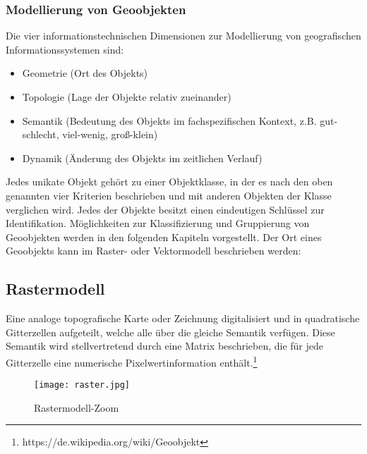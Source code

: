 \documentclass[11pt,ceqn]{book}
\begin{document}
\subsubsection{Modellierung von Geoobjekten}
Die vier informationstechnischen Dimensionen zur Modellierung von geografischen Informationssystemen sind:
\begin{itemize}
\item Geometrie (Ort des Objekts)
\item Topologie (Lage der Objekte relativ zueinander)
\item Semantik (Bedeutung des Objekts im fachspezifischen Kontext, z.B. gut-schlecht, viel-wenig, groß-klein)
\item Dynamik (Änderung des Objekts im zeitlichen Verlauf)
\end{itemize}
Jedes unikate Objekt gehört zu einer Objektklasse, in der es nach den oben genannten vier Kriterien beschrieben und mit anderen Objekten der Klasse verglichen wird. Jedes der Objekte besitzt einen eindeutigen Schlüssel zur Identifikation. Möglichkeiten zur Klassifizierung und Gruppierung von Geoobjekten werden in den folgenden Kapiteln vorgestellt.\newline
Der Ort eines Geoobjekts kann im Raster- oder Vektormodell beschrieben werden:

\subsection{Rastermodell}
Eine analoge topografische Karte oder Zeichnung digitalisiert und in quadratische Gitterzellen aufgeteilt, welche alle über die gleiche Semantik verfügen. Diese Semantik wird stellvertretend durch eine Matrix beschrieben, die für jede Gitterzelle eine numerische Pixelwertinformation enthält.\footnote{https://de.wikipedia.org/wiki/Geoobjekt}
\begin{figure}[H]
\centering
\texttt{[image: raster.jpg]}
\caption{Rastermodell-Zoom \protect\footnotemark}
\end{figure}
\end{document}
